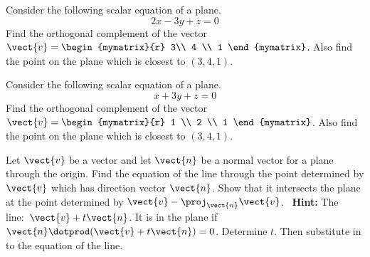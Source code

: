 \begin{enumialphparenastyle}

\begin{ex} Consider the following scalar equation of a plane. 
\begin{equation*}
2x-3y+z=0
\end{equation*}
Find the orthogonal complement of the vector $\vect{v}=\begin{mymatrix}{r}
3\\
4 \\
1
\end{mymatrix}$.
Also find the point on the plane which is closest to $(3,4,1)$.
\end{ex}


\begin{ex} Consider the following scalar equation of a plane. 
\begin{equation*}
x+3y+z=0
\end{equation*}
Find the orthogonal complement of the vector $\vect{v}=\begin{mymatrix}{r}
 1 \\
2 \\
1
\end{mymatrix}$.
Also find the point on the plane which is closest to $(3,4,1)$.
\end{ex}

\begin{ex} Let $\vect{v}$ be a vector and let $\vect{n}$ be a normal vector for a
plane through the origin. Find the equation of the line through the point
determined by $\vect{v}$ which has direction vector $\vect{n}$. Show that it
intersects the plane at the point determined by $\vect{v}-\proj_{\vect{n}
}\vect{v}$. \ \textbf{Hint: }The line:\ $\vect{v}+t\vect{n}$. It is in the
plane if $\vect{n}\dotprod (\vect{v}+t\vect{n}) =0$. Determine $t$.
Then substitute in to the equation of the line.
\end{ex}


\end{enumialphparenastyle}
